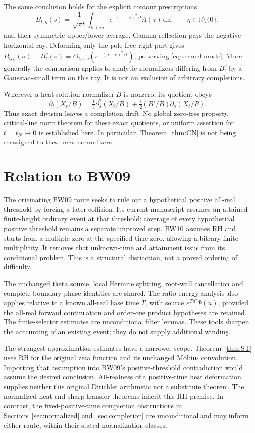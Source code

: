 \documentclass[11pt]{article}
\newcommand{\dd}{\,\mathrm d}
\begin{document}
The same conclusion holds for the explicit contour prescriptions
\[
 B_{t,\eta}(s)=\frac1{\sqrt{\pi t}}
     \int_{\mathbb R+i\eta}e^{-(z-s)^2/t}A(z)\dd z,
       \qquad \eta\in\mathbb R\setminus\{0\},
\]
and their symmetric upper/lower average. Gamma reflection pays the
negative horizontal ray. Deforming only the pole-free right part gives
\(B_{t,\eta}(\sigma)-B_t^c(\sigma)
=O_{t,c,\eta}(e^{-(\sigma-c)^2/t})\), preserving
\eqref{eq:second-mode}. More generally the comparison applies to
analytic normalizers differing from \(B_t^c\) by a Gaussian-small
term on this ray. It is not an exclusion of arbitrary completions.

Wherever a heat-solution normalizer \(B\) is nonzero, its quotient
obeys
\[
 \partial_t(X_t/B)=\tfrac14\partial_s^2(X_t/B)
               +\tfrac12(B'/B)\partial_s(X_t/B).
\]
Thus exact division leaves a completion drift. No global zero-free
property, critical-line norm theorem for these exact quotients, or
uniform assertion for \(t=t_N\to0\) is established here. In particular,
Theorem~\ref{thm:CN} is not being reassigned to these new normalizers.

\section{Relation to BW09}
The originating BW09 route seeks to rule out a hypothetical positive
all-real threshold by forcing a later collision. Its current manuscript
assumes an attained finite-height ordinary event at that threshold;
coverage of every hypothetical positive threshold remains a separate
unproved step. BW10 assumes RH and starts from a multiple zero at the
specified time zero, allowing arbitrary finite multiplicity. It removes
that unknown-time and attainment issue from its conditional problem.
This is a structural distinction, not a proved ordering of difficulty.

The unchanged theta source, local Hermite splitting, root-wall
cancellation and complete boundary-phase identities are shared.
The ratio-energy analysis also applies relative to a known all-real
base time \(T\), with source \(e^{Tu^2}\Phi(u)\), provided the
all-real forward continuation and order-one product hypotheses are
retained. The finite-selector estimates are unconditional filter lemmas.
These tools sharpen the accounting of an existing event; they do not
supply additional winding.

The strongest approximation estimates have a narrower scope.
Theorem~\ref{thm:ST} uses RH for the original zeta function and its
unchanged M\"obius convolution. Importing that assumption into BW09's
positive-threshold contradiction would assume the desired conclusion.
All-realness of a positive-time heat deformation supplies neither this
original Dirichlet arithmetic nor a substitute theorem.
The normalized heat and sharp transfer theorems inherit this RH premise.
In contrast, the fixed-positive-time completion obstructions in
Sections~\ref{sec:normalized} and~\ref{sec:completion} are unconditional
and may inform either route, within their stated normalization classes.
\end{document}
